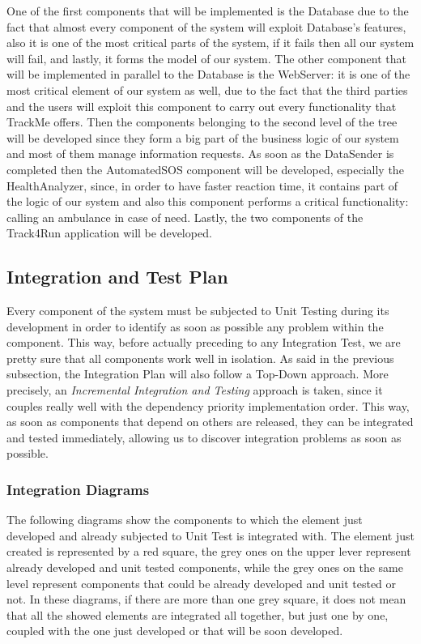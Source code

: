 \noindent
One of the first components that will be implemented is the Database due to the fact that almost every component of the system will exploit Database's features, also it is one of the most critical parts of the system, if it fails then all our system will fail, and lastly, it forms the model of our system.
\medbreak
\noindent
The other component that will be implemented in parallel to the Database is the WebServer: it is one of the most critical element of our system as well, due to the fact that the third parties and the users will exploit this component to carry out every functionality that TrackMe offers.
\medbreak
\noindent
Then the components belonging to the second level of the tree will be developed since they form a big part of the business logic of our system and most of them manage information requests.
\medbreak
\noindent
As soon as the DataSender is completed then the AutomatedSOS component will be developed, especially the HealthAnalyzer, since, in order to have faster reaction time, it contains part of the logic of our system and also this component performs a critical functionality: calling an ambulance in case of need.
\medbreak
\noindent
Lastly, the two components of the Track4Run application will be developed.

\subsection{Integration and Test Plan}
Every component of the system must be subjected to Unit Testing during its development in order to identify as soon as possible any problem within the component. This way, before actually preceding to any Integration Test, we are pretty sure that all components work well in isolation.
\medbreak
\noindent
As said in the previous subsection, the Integration Plan will also follow a Top-Down approach. More precisely, an \textit{Incremental Integration and Testing} approach is taken, since it couples really well with the dependency priority implementation order. This way, as soon as components that depend on others are released, they can be integrated and tested immediately, allowing us to discover integration problems as soon as possible.

\subsubsection{Integration Diagrams}
The following diagrams show the components to which the element just developed and already subjected to Unit Test is integrated with. The element just created is represented by a red square, the grey ones on the upper lever represent already developed and unit tested components, while the grey ones on the same level represent components that could be already developed and unit tested or not. In these diagrams, if there are more than one grey square, it does not mean that all the showed elements are integrated all together, but just one by one, coupled with the one just developed or that will be soon developed.


